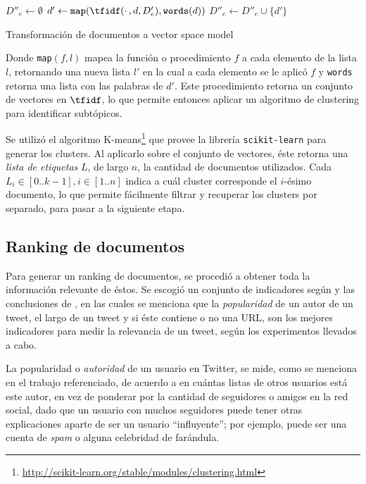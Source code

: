 \documentclass[upright, contnum]{umemoria}
\begin{document}
\begin{algorithm}[H]
$D''_e \leftarrow \emptyset$ \;
 {
   $d' \leftarrow \texttt{map}(\tfidf(\cdotp, d, D'_e), \texttt{words}(d))$\;
}
$D''_e \leftarrow D''_e \cup \{d'\}$\;
\caption{Transformación de documentos a vector space model}
\end{algorithm}

    Donde \texttt{map}$(f,l)$ mapea la
    función o procedimiento $f$ a cada elemento de la lista $l$,
    retornando una nueva lista $l'$ en la cual a cada elemento se le
    aplicó $f$ y \texttt{words} retorna una lista con las palabras de
    $d'$. Este procedimiento retorna un conjunto de vectores en
    $\tfidf$, lo que permite entonces aplicar un algoritmo de
    clustering para identificar subtópicos.

    Se utilizó el algoritmo
    K-means\footnote{\href{http://scikit-learn.org/stable/modules/clustering.html}{http://scikit-learn.org/stable/modules/clustering.html} } 
    que provee la librería
    \texttt{scikit-learn} para generar los clusters. Al
    aplicarlo sobre el conjunto de vectores, éste retorna una 
    \emph{lista de etiquetas} $L$, de largo $n$, la cantidad de documentos
    utilizados. Cada $L_i \in [0..k-1], i \in [1..n]$ indica a cuál
    cluster corresponde el $i$-ésimo documento, lo que permite
    fácilmente filtrar y recuperar los clusters por separado, para
    pasar a la siguiente etapa.


\subsection{Ranking de documentos}
\label{sec-4.2.3}


    Para generar un ranking de documentos, se procedió a obtener toda
    la información relevante de éstos. Se escogió un conjunto de
    indicadores según \cite{Castillo:2011:ICT:1963405.1963500} y las
    conclusiones de \cite{Duan:2010:ESL:1873781.1873815}, en
    las cuales se menciona
    que la \emph{popularidad} de un autor de un tweet, el largo de un tweet
    y si éste contiene o no una URL, son los mejores indicadores para
    medir la relevancia de un tweet, según los experimentos llevados a
    cabo. 

    La popularidad o \emph{autoridad} de un usuario en Twitter, se mide,
    como se menciona en el trabajo referenciado, de acuerdo a en
    cuántas listas de otros usuarios está este autor, en vez de
    ponderar por la cantidad de seguidores o amigos en la red social,
    dado que un usuario con muchos seguidores puede tener otras
    explicaciones aparte de ser un usuario ``influyente''; por ejemplo,
    puede ser una cuenta de \emph{spam} o alguna celebridad de farándula.
\end{document}
